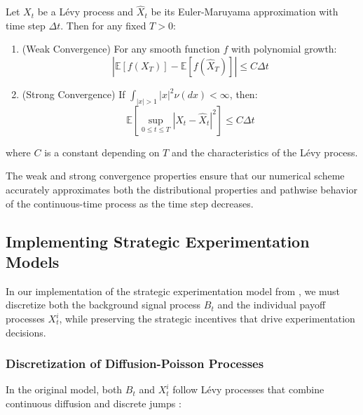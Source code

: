 \begin{theorem}
\label{thm:euler_maruyama_convergence}
Let $X_t$ be a Lévy process and $\hat{X}_t$ be its Euler-Maruyama approximation with time step $\Delta t$. Then for any fixed $T > 0$:
\begin{enumerate}
    \item (Weak Convergence) For any smooth function $f$ with polynomial growth:
    \begin{equation}
        |\mathbb{E}[f(X_T)] - \mathbb{E}[f(\hat{X}_T)]| \leq C\Delta t
    \end{equation}
    
    \item (Strong Convergence) If $\int_{|x|>1} |x|^2 \nu(dx) < \infty$, then:
    \begin{equation}
        \mathbb{E}[\sup_{0\leq t\leq T} |X_t - \hat{X}_t|^2] \leq C\Delta t
    \end{equation}
\end{enumerate}
where $C$ is a constant depending on $T$ and the characteristics of the Lévy process.
\citep{protter2005stochastic, platen2010numerical}
\end{theorem}

The weak and strong convergence properties ensure that our numerical scheme accurately approximates both the distributional properties and pathwise behavior of the continuous-time process as the time step decreases.

\subsection{Implementing Strategic Experimentation Models}
\label{appendix:strategic_experimentation_implementation}

In our implementation of the strategic experimentation model from \citet{keller2020undiscounted}, we must discretize both the background signal process $B_t$ and the individual payoff processes $X^i_t$, while preserving the strategic incentives that drive experimentation decisions.

\subsubsection{Discretization of Diffusion-Poisson Processes}
\label{appendix:discretization_diffusion_poisson}

In the original model, both $B_t$ and $X^i_t$ follow Lévy processes that combine continuous diffusion and discrete jumps \citep{applebaum2009levy}:

